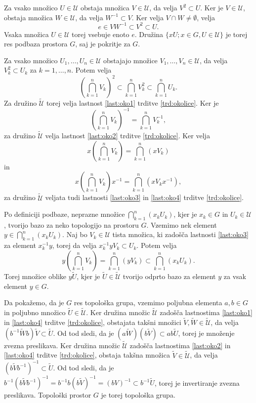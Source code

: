 \documentclass[mat1]{fmfdelo}
\newcommand{\Ucurl}{\mathcal{U}}
\begin{document}
\begin{dokaz}
Za vsako množico $U \in \Ucurl$ obstaja množica $V \in \Ucurl$, da velja $V^2 \subset U$. Ker je $V \in \Ucurl$, obstaja množica $W \in \Ucurl$, da velja $W^{-1} \subset V$. Ker velja $V \cap W \neq \emptyset$, velja
\[ e \in VW^{-1} \subset V^2 \subset U. \]
Vsaka množica $U \in \Ucurl$ torej vsebuje enoto $e$.
Družina $\lbrace xU ; x \in G, U \in \Ucurl \rbrace$ je torej res podbaza prostora $G$, saj je pokritje za $G$.

Za vsako množico $U_1,\dots,U_n \in \Ucurl$ obstajajo množice $V_1,\dots,V_n \in \Ucurl$, da velja $V_k^2 \subset U_k$ za $k = 1,\dots,n$. Potem velja
\[ \left( \bigcap_{k=1}^n V_k \right)^2 \subset \bigcap_{k=1}^n V_k^2 \subset \bigcap_{k=1}^n U_k. \]
Za družino $\widetilde{\Ucurl}$ torej velja lastnost \ref{last:oko1} trditve \ref{trd:okolice}.
Ker je \[\left( \bigcap_{k=1}^n V_k \right)^{-1} = \bigcap_{k=1}^n V_k^{-1},\] za družino $\widetilde{\Ucurl}$ velja lastnost \ref{last:oko2} trditve \ref{trd:okolice}.
Ker velja \[x\left(\bigcap_{k=1}^n V_k\right) = \bigcap_{k=1}^n (xV_k)\]
in \[ x\left(\bigcap_{k=1}^n V_k\right)x^{-1} = \bigcap_{k=1}^n (xV_kx^{-1}), \]
za družino $\widetilde{\Ucurl}$ veljata tudi lastnosti \ref{last:oko3} in \ref{last:oko4} trditve \ref{trd:okolice}.

Po definiciji podbaze, neprazne množice $\bigcap_{k=1}^n(x_kU_k)$, kjer je $x_k \in G$ in $U_k \in \Ucurl$, tvorijo bazo za neko topologijo na prostoru $G$. Vzemimo nek element $y \in \bigcap_{k=1}^n (x_kU_k)$. Naj bo $V_k \in \Ucurl$ tista množica, ki zadošča lastnosti \ref{last:oko3} za element $x_k^{-1}y$, torej da velja $x_k^{-1}yV_k \subset U_k$. Potem velja
\[ y\left(\bigcap_{k=1}^nV_k\right) = \bigcap_{k=1}^n(yV_k) \subset \bigcap_{k=1}^n(x_kU_k). \]
Torej množice oblike $y\widetilde{U}$, kjer je $\widetilde{U} \in \widetilde{\Ucurl}$ tvorijo odprto bazo za element $y$ za vsak element $y \in G$.

Da pokažemo, da je $G$ res topološka grupa, vzemimo poljubna elementa $a,b \in G$ in poljubno množico $\widetilde{U} \in \widetilde{\Ucurl}$. Ker družina množic $\widetilde{\Ucurl}$ zadošča lastnostima \ref{last:oko1} in \ref{last:oko4} trditve \ref{trd:okolice}, obstajata takšni množici $\widetilde{V}, \widetilde{W} \in \widetilde{\Ucurl}$, da velja $(b^{-1}\widetilde{W}b)\widetilde{V} \subset \widetilde{U}$. Od tod sledi, da je $(a\widetilde{W})(b\widetilde{V}) \subset ab\widetilde{U}$, torej je množenje zvezna preslikava.
Ker družina množic $\widetilde{\Ucurl}$ zadošča lastnostima \ref{last:oko2} in \ref{last:oko4} trditve \ref{trd:okolice}, obstaja takšna množica $\widetilde{V} \in \widetilde{\Ucurl}$, da velja $(b\widetilde{V}b^{-1})^{-1} \subset \widetilde{U}$. Od tod sledi, da je $b^{-1}(b\widetilde{V}b^{-1})^{-1} = b^{-1}b (b\widetilde{V})^{-1} = (bV)^{-1} \subset b^{-1}\widetilde{U}$, torej je invertiranje zvezna preslikava. Topološki prostor $G$ je torej topološka grupa.


\end{dokaz}
\end{document}
